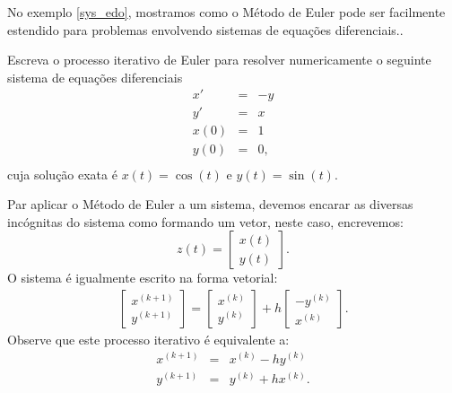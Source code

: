 No exemplo \ref{sys_edo}, mostramos como o Método de Euler pode ser facilmente estendido para problemas envolvendo sistemas de equações diferenciais..
\begin{ex}\label{sys_edo} Escreva o processo iterativo de Euler para resolver numericamente o seguinte sistema de equações diferenciais
\begin{eqnarray*}
x'&=&-y\\
y'&=&x\\
x(0)&=&1\\
y(0)&=&0,\\
\end{eqnarray*}
cuja solução exata é $x(t)=\cos(t)$ e $y(t)=\sin(t)$.
\end{ex}
Par aplicar o Método de Euler a um sistema, devemos encarar as diversas incógnitas do sistema como formando um vetor, neste caso, encrevemos: 
 $$z(t)=\left[\begin{array}{c}x(t)\\y(t)\end{array}\right].$$
 O sistema é igualmente escrito na forma vetorial:
\begin{eqnarray*}
\left[\begin{array}{c}x^{(k+1)}\\y^{(k+1)}\end{array}\right]=\left[\begin{array}{c}x^{(k)}\\y^{(k)}\end{array}\right]+h\left[\begin{array}{c}-y^{(k)}\\x^{(k)}\end{array}\right].
\end{eqnarray*}
Observe que este processo iterativo é equivalente a:
\begin{eqnarray*}
x^{(k+1)}&=&x^{(k)}-hy^{(k)}\\
y^{(k+1)}&=&y^{(k)}+hx^{(k)}.
\end{eqnarray*}


